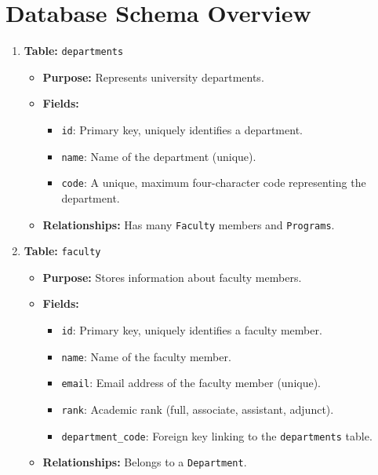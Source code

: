 \documentclass{article}
\begin{document}
	\section*{Database Schema Overview}
		\begin{enumerate}
		    \item \textbf{Table:} \texttt{departments}
		    \begin{itemize}
		        \item \textbf{Purpose:} Represents university departments.
		        \item \textbf{Fields:}
		        \begin{itemize}
		            \item \texttt{id}: Primary key, uniquely identifies a department.
		            \item \texttt{name}: Name of the department (unique).
		            \item \texttt{code}: A unique, maximum four-character code representing the department.
		        \end{itemize}
		        \item \textbf{Relationships:} Has many \texttt{Faculty} members and \texttt{Programs}.
		    \end{itemize}

		    \item \textbf{Table:} \texttt{faculty}
		    \begin{itemize}
		        \item \textbf{Purpose:} Stores information about faculty members.
		        \item \textbf{Fields:}
		        \begin{itemize}
		            \item \texttt{id}: Primary key, uniquely identifies a faculty member.
		            \item \texttt{name}: Name of the faculty member.
		            \item \texttt{email}: Email address of the faculty member (unique).
		            \item \texttt{rank}: Academic rank (full, associate, assistant, adjunct).
		            \item \texttt{department\_code}: Foreign key linking to the \texttt{departments} table.
		        \end{itemize}
		        \item \textbf{Relationships:} Belongs to a \texttt{Department}.
		    \end{itemize}


\end{enumerate}
\end{document}
